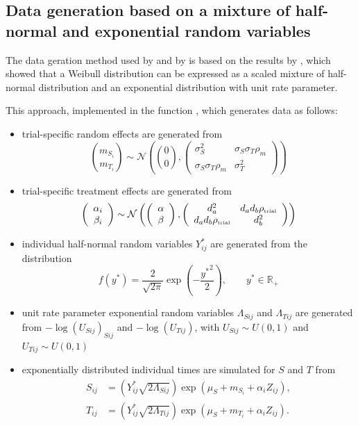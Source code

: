 \documentclass[article,shortnames, nojss]{jss}\usepackage[]{graphicx}\usepackage[]{color}
\begin{document}
\subsection{Data generation based on a mixture of half-normal and exponential random variables}
The data geration method used by \cite{ShiEtal11}
  and by \cite{RenfroEtal12} is based on the results by \cite{Cowles04},
  which showed that a Weibull distribution can be expressed as a scaled mixture
  of half-normal distribution and an exponential distribution
  with unit rate parameter.

This approach, implemented in the function ,
  which generates data as follows:
  \begin{itemize}
    \item trial-specific random effects are generated from
      $$
        \binom{m_{S_i}}{m_{T_i}} \sim \mathcal N \left(
        \binom00, \left(\begin{array}{cc}
          \sigma^2_S & \sigma_S\sigma_T\rho_m \\
          \sigma_S\sigma_T\rho_m &  \sigma^2_T
        \end{array}\right)
        \right)
      $$
    \item trial-specific treatment effects are generated from
      $$
        \left(\begin{array}{c} 
        {\alpha_i}\\ {\beta_i}\end{array}\right)
          \sim \mathcal N
          \left(
        \left(\begin{array}{c}
        \alpha\\ \beta\end{array}\right), 
        \left(\begin{array}{cc} 
          d_a^2 &
          d_a d_b{\rho_\text{\tiny trial}} \\
          d_a d_b{\rho_\text{\tiny trial}} &
          d_b^2 \\
        \end{array}\right)
        \right)
      $$
    \item individual half-normal random variables $Y^\ast_{ij}$ 
      are generated from the distribution
      $$
        f(y^\ast) = \frac2{\sqrt{2\pi}} \exp\left(-\frac{{y^\ast}^2}2\right),
        \qquad y^\ast \in \mathbb R_+
      $$
    \item unit rate parameter exponential random variables
      $\Lambda_{Sij}$ and  $\Lambda_{Tij}$ are generated from
      $-\log(U_{Sij})_{Sij}$ and $-\log(U_{Tij})$,
      with $U_{Sij} \sim U(0,1)$ and $U_{Tij} \sim U(0,1)$
    \item exponentially distributed individual times are simulated
      for $S$ and $T$ from
      \begin{align*}
        S_{ij} &= \left(
        Y^\ast_{ij} \sqrt{2\Lambda_{Sij}}
        \right) \exp(\mu_S + m_{S_i} + \alpha_i Z_{ij}), \\
        T_{ij} &= \left(
        Y^\ast_{ij} \sqrt{2\Lambda_{Tij}}
        \right) \exp(\mu_S + m_{T_i} + \alpha_i Z_{ij}).
      \end{align*}
  \end{itemize}
\end{document}
